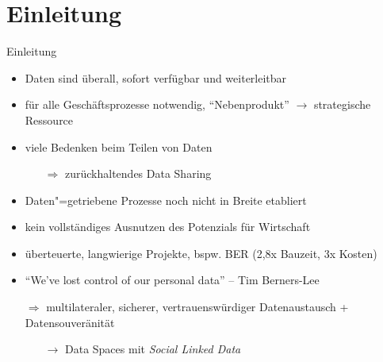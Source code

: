 
{
    \section{Einleitung}
}

\begin{frame}{Einleitung}
    \begin{itemize}
        \item Daten sind überall, sofort verfügbar und weiterleitbar
        \item für alle Geschäftsprozesse notwendig, \enquote{Nebenprodukt} $\to$ strategische Ressource~\cite{mollerIndustrialDataEcosystems2024}
        
        \pause
        \item viele Bedenken beim Teilen von Daten~\cite{mollerIndustrialDataEcosystems2024}
        \begin{itemize}
            
            \pause
            \item[$\Rightarrow$] zurückhaltendes Data Sharing
        \end{itemize}


        \pause
        \item Daten"=getriebene Prozesse noch nicht in Breite etabliert
        \item kein vollständiges Ausnutzen des Potenzials für Wirtschaft

        \pause
        \item überteuerte, langwierige Projekte, bspw. BER (2,8x Bauzeit, 3x Kosten)~\cite{stalinskiBestBERZahlen2020}
        
        \pause
        \item \enquote{We've \alert{lost control} of our personal data} -- Tim Berners-Lee~\cite{berners-leeThreeChallengesWeb2017}
        
        \pause
        \item[$\Rightarrow$] multilateraler, sicherer, vertrauenswürdiger Datenaustausch + Datensouveränität~\cite{mollerIndustrialDataEcosystems2024}
        \pause
        \begin{itemize}
            \item[$\to$] Data Spaces mit \emph{Social Linked Data}~\cite{mecklerWebLinkedData2023}
        \end{itemize}
    \end{itemize}
\end{frame}
